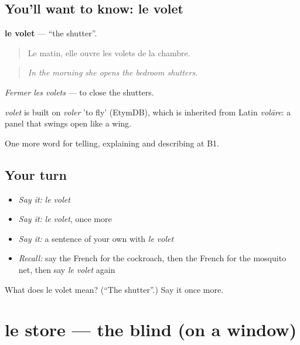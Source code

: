 \subsection*{You'll want to know: le volet}
\textbf{le volet} — \textquotedblleft{}the shutter\textquotedblright{}.

\begin{quote}
Le matin, elle ouvre les volets de la chambre.
\end{quote}

\begin{quote}
\emph{In the morning she opens the bedroom shutters.}
\end{quote}

\emph{Fermer les volets} — to close the shutters.

\begin{cousinweb}
\emph{volet} is built on \emph{voler} 'to fly' (EtymDB), which is inherited from Latin \emph{volāre}: a panel that swings open like a wing.
\end{cousinweb}

\begin{grammarlens}[title={What you've built}]
One more word for telling, explaining and describing at B1.
\end{grammarlens}

\subsection*{Your turn}
\begin{itemize}
\raggedright
  \item \emph{Say it:} \emph{le volet}
  \item \emph{Say it:} \emph{le volet}, once more
  \item \emph{Say it:} a sentence of your own with \emph{le volet}
  \item \emph{Recall:} say the French for the cockroach, then the French for the mosquito net, then say \emph{le volet} again
\end{itemize}

\begin{tcolorbox}[breakable,colback=teal!4,colframe=teal!35!black,title={Before you move on}]
What does le volet mean? (\textquotedblleft{}The shutter\textquotedblright{}.) Say it once more.
\end{tcolorbox}
\section[le store]{le store — the blind (on a window)}

